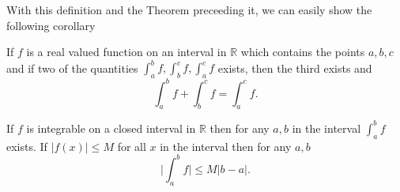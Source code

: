With this definition and the Theorem preceeding it, we can easily show the following corollary
\begin{Corollary}
    If $f$ is a real valued function on an interval in $\mathbb{R}$ which contains the points
    $a,b,c$ and if two of the quantities $\int_a^b f, \int_b^c f, \int_a^c f$ exists, then the third
    exists and 
    \[ \int_a^b f + \int_b^c f = \int_a^c f .\]
\end{Corollary}
\begin{Corollary}
    If $f$ is integrable on a closed interval in $\mathbb{R}$ then for any $a,b$ in the interval
    $\int_a^b f$ exists. If $\lvert f(x) \rvert \leq M$ for all $x$ in the interval then for any
    $a,b$ 
    \[\lvert \int_a^b f \rvert \leq M \lvert b - a \rvert . \]
\end{Corollary}

